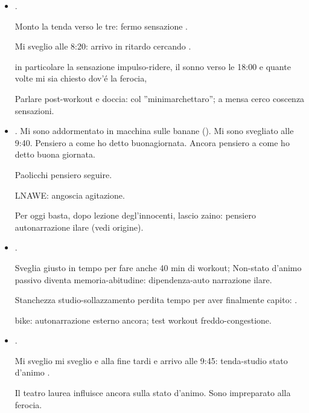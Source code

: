 \begin{itemize}
Trazioni: dov'\'e la ferocia?: ...

Sensazione: angoscia dopo aver guardato il ragazzo al tavolo.

\item {}.

Monto la tenda verso le tre: fermo  sensazione .

Mi sveglio alle 8:20: arrivo in ritardo cercando .

 in particolare la sensazione impulso-ridere, il sonno verso le 18:00 e quante volte mi sia chiesto dov'\'e la ferocia,

Parlare post-workout e doccia:  col ''minimarchettaro''; a mensa cerco coscenza sensazioni.

\item {}. Mi sono addormentato in macchina sulle banane (). Mi sono svegliato alle 9:40. Pensiero a come ho detto buonagiornata. Ancora pensiero a come ho detto buona giornata.

Paolicchi pensiero seguire.

LNAWE: angoscia agitazione.

Per oggi basta, dopo lezione degl'innocenti, lascio zaino: pensiero autonarrazione ilare (vedi origine).

\item {}.

Sveglia giusto in tempo per fare anche 40 min di workout; Non-stato d'animo passivo diventa memoria-abitudine: dipendenza-auto narrazione ilare.

Stanchezza studio-sollazzamento perdita tempo per aver finalmente capito: .

 bike: autonarrazione esterno ancora; test workout freddo-congestione.

\item {}.

Mi sveglio mi sveglio e alla fine tardi e arrivo alle 9:45: tenda-studio stato d'animo .

Il teatro laurea influisce ancora sulla stato d'animo. Sono impreparato alla ferocia.


\end{itemize}
